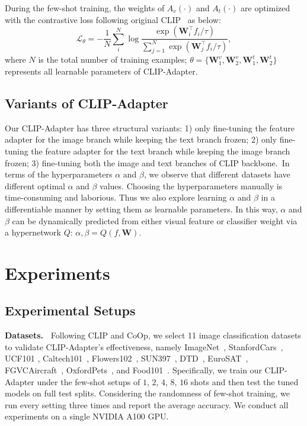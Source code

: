 \documentclass[default,iicol]{sn-jnl}%
\theoremstyle{thmstyleone}%
\theoremstyle{thmstyletwo}%
\theoremstyle{thmstylethree}%
\begin{document}
During the few-shot training, the weights of $A_v(\cdot)$ and $A_t(\cdot)$ are optimized with the contrastive loss following original CLIP~\cite{radford2021learning} as below:
\begin{equation}
\mathcal{L}_{\theta} = -\frac{1}{N} \sum_{i}^{N} \log \frac{\exp \left(\mathbf{W}_{i}^{\top} f_{i} / \tau\right)}{\sum_{j=1}^{N} \exp \left(\mathbf{W}_{j}^{\top} f_{i} / \tau\right)}, \nonumber
\end{equation}
where $N$ is the total number of training examples; $\theta = \{\mathbf{W}_1^v, \mathbf{W}_2^v, \mathbf{W}_1^t, \mathbf{W}_2^t\}$ represents all learnable parameters of CLIP-Adapter.

\subsection{Variants of CLIP-Adapter}
\label{sec:variants}

Our CLIP-Adapter has three structural variants: 1) only fine-tuning the feature adapter for the image branch while keeping the text branch frozen; 2) only fine-tuning the feature adapter for the text branch while keeping the image branch frozen; 3) fine-tuning both the image and text branches of CLIP backbone.~In terms of the hyperparameters $\alpha$ and $\beta$, we observe that different datasets have different optimal $\alpha$ and $\beta$ values. Choosing the hyperparameters manually is time-consuming and laborious. Thus we also explore learning $\alpha$ and $\beta$ in a differentiable manner by setting them as learnable parameters. In this way, $\alpha$ and $\beta$ can be dynamically predicted from either visual feature or classifier weight via a hypernetwork $Q$: $\alpha, \beta = Q(f, \mathbf{W})$. 


\section{Experiments}
\subsection{Experimental Setups}

\noindent\textbf{Datasets.~}
Following CLIP and CoOp, we select 11 image classification datasets to validate CLIP-Adapter's effectiveness, namely ImageNet~\cite{deng2009imagenet}, StanfordCars~\cite{krause20133d}, UCF101 \cite{soomro2012ucf101}, Caltech101~\cite{fei2004learning}, Flowers102~\cite{nilsback2008automated}, SUN397~\cite{xiao2010sun}, DTD~\cite{cimpoi2014describing}, EuroSAT~\cite{helber2019eurosat}, FGVCAircraft~\cite{maji2013fine}, OxfordPets~\cite{parkhi2012cats}, and Food101~\cite{bossard2014food}. Specifically, we train our CLIP-Adapter under the few-shot setups of $1$, $2$, $4$, $8$, $16$ shots and then test the tuned models on full test splits. Considering the randomness of few-shot training, we run every setting three times and report the average accuracy. We conduct all experiments on a single NVIDIA A100 GPU.
\end{document}
